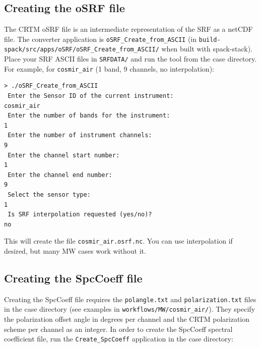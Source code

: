 \subsection{Creating the oSRF file}
The CRTM oSRF file is an intermediate representation of the SRF as a netCDF file. The converter application is \verb|oSRF_Create_from_ASCII| (in \verb|build-spack/src/apps/oSRF/oSRF_Create_from_ASCII/| when built with spack-stack).
Place your SRF ASCII files in \verb|SRFDATA/| and run the tool from the case directory. For example, for \verb|cosmir_air| (1 band, 9 channels, no interpolation):
\begin{verbatim}
> ./oSRF_Create_from_ASCII
 Enter the Sensor ID of the current instrument: 
cosmir_air
 Enter the number of bands for the instrument: 
1
 Enter the number of instrument channels: 
9
 Enter the channel start number: 
1
 Enter the channel end number: 
9
 Select the sensor type:
1
 Is SRF interpolation requested (yes/no)?
no
\end{verbatim}
This will create the file \verb|cosmir_air.osrf.nc|.  You can use interpolation if desired, but many MW cases work without it.

\subsection{Creating the SpcCoeff file}
Creating the SpcCoeff file requires the \verb|polangle.txt| and \verb|polarization.txt| files in the case directory (see examples in \verb|workflows/MW/cosmir_air/|).
They specify the polarization offset angle in degrees per channel and the CRTM polarization scheme per channel as an integer.
In order to create the SpcCoeff spectral coefficient file, run the \verb|Create_SpcCoeff| application in the case directory:

